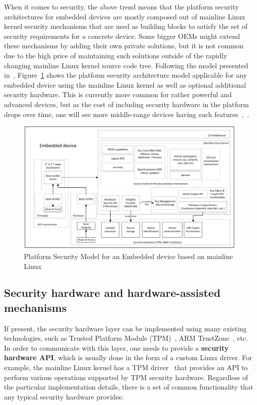When it comes to security, the above trend means that the platform security architectures for embedded devices are mostly composed out of mainline Linux kernel security mechanisms that are used as building blocks to satisfy the set of security requirements for a concrete device. Some bigger OEMs might extend these mechanisms by adding their own private solutions, but it is not common due to the high price of maintaining such solutions outside of the rapidly changing mainline Linux kernel source code tree. Following the model presented in~\cite{2013Asokan}, Figure~\ref{fig:platsec} shows the platform security architecture model applicable for any embedded device using the mainline Linux kernel as well as optional additional security hardware. This is currently more common for rather powerful and advanced devices, but as the cost of including security hardware in the platform drops over time, one will see more middle-range devices having such features~\cite{marketresearch},~\cite{iothwsecurity}. 


\begin{figure}
	\centering
		\includegraphics[width=1\textwidth]{figures/LinuxKernelPlatSecModel.png}
	\caption{Platform Security Model for an Embedded device based on mainline Linux}
	\label{fig:platsec}
\end{figure}

\subsection{Security hardware and hardware-assisted mechanisms}

If present, the security hardware layer can be implemented using many existing technologies, such as Trusted Platform Module (TPM)~\cite{tpm}, ARM TrustZone~\cite{trustzone}, etc. In order to communicate with this layer, one needs to provide a \textbf{security hardware API}, which is usually done in the form of a custom Linux driver. For example, the mainline Linux kernel has a TPM driver~\cite{tpmdriver} that provides an API to perform various operations supported by TPM security hardware. Regardless of the particular implementation details, there is a set of common functionality that any typical security hardware provides:

